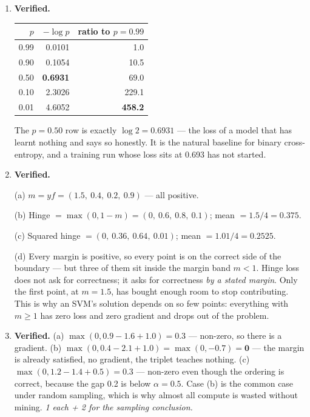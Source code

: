 \documentclass[11pt,a4paper]{article}
\newcommand{\A}[1]{\item[\textbf{#1}]}
\begin{document}
\begin{enumerate}[leftmargin=1.9cm]
\A{U2.23} \textbf{Verified.}
\begin{answerbox}
\begin{center}\begin{tabular}{@{}rrr@{}}\toprule
$p$ & $-\log p$ & ratio to $p=0.99$\\
\midrule
0.99 & 0.0101 & 1.0\\ 0.90 & 0.1054 & 10.5\\ 0.50 & \textbf{0.6931} & 69.0\\
0.10 & 2.3026 & 229.1\\ 0.01 & 4.6052 & \textbf{458.2}\\
\bottomrule\end{tabular}\end{center}
The $p = 0.50$ row is exactly $\log 2 = 0.6931$ --- the loss of a model that
has learnt nothing and says so honestly. It is the natural baseline for binary
cross-entropy, and a training run whose loss sits at 0.693 has not started.
\end{answerbox}

\A{U2.24} \textbf{Verified.}
\begin{answerbox}
(a) $m = y f = (1.5,\ 0.4,\ 0.2,\ 0.9)$ --- all positive.

(b) Hinge $= \max(0, 1-m) = (0,\ 0.6,\ 0.8,\ 0.1)$; mean $= 1.5/4 =
\mathbf{0.375}$.

(c) Squared hinge $= (0,\ 0.36,\ 0.64,\ 0.01)$; mean $= 1.01/4 =
\mathbf{0.2525}$.

(d) Every margin is positive, so every point is on the correct side of the
boundary --- but three of them sit inside the margin band $m < 1$. Hinge loss
does not ask for correctness; it asks for correctness \emph{by a stated
margin}. Only the first point, at $m = 1.5$, has bought enough room to stop
contributing. This is why an SVM's solution depends on so few points: everything
with $m \ge 1$ has zero loss and zero gradient and drops out of the problem.
\end{answerbox}

\A{U2.25} \textbf{Verified.} (a) $\max(0, 0.9-1.6+1.0) = \mathbf{0.3}$ ---
non-zero, so there is a gradient. (b) $\max(0, 0.4-2.1+1.0) = \max(0,-0.7) =
\mathbf{0}$ --- the margin is already satisfied, no gradient, the triplet
teaches nothing. (c) $\max(0, 1.2-1.4+0.5) = \mathbf{0.3}$ --- non-zero even
though the ordering is correct, because the gap 0.2 is below $\alpha = 0.5$.
Case (b) is the common case under random sampling, which is why almost all
compute is wasted without mining.
\emph{1 each + 2 for the sampling conclusion.}


\end{enumerate}
\end{document}
